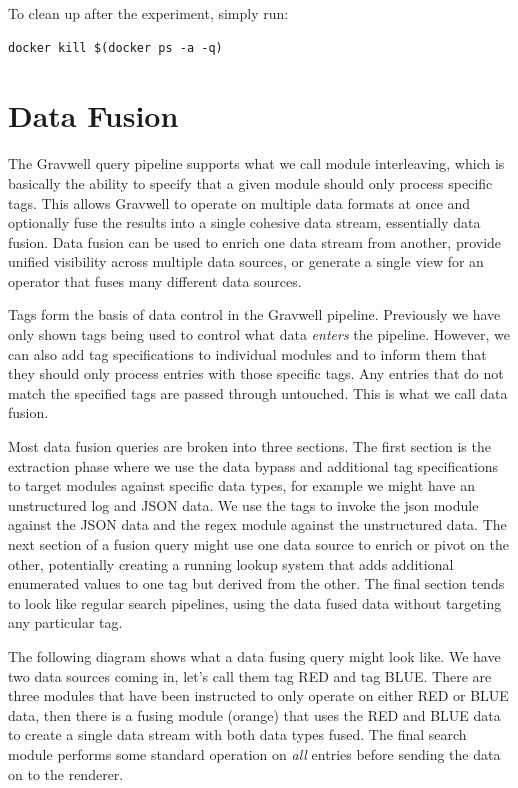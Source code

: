 To clean up after the experiment, simply run:

\begin{Verbatim}[breaklines=true]
docker kill $(docker ps -a -q)
\end{Verbatim}


\clearpage

\section{Data Fusion}
The Gravwell query pipeline supports what we call module interleaving,
which is basically the ability to specify that a given module should only process
specific tags. This allows Gravwell to operate on multiple data formats
at once and optionally fuse the results into a single cohesive data
stream, essentially data fusion. Data fusion can be used to enrich one
data stream from another, provide unified visibility across multiple
data sources, or generate a single view for an operator that fuses many
different data sources.

Tags form the basis of data control in the Gravwell pipeline.
Previously we have only shown tags being used
to control what data \emph{enters} the pipeline. However, we can also add tag
specifications to individual modules and to inform them that they should
only process entries with those specific tags. Any entries that do not
match the specified tags are passed through untouched. This is what we
call data fusion.

Most data fusion queries are broken into three sections. The first section
is the extraction phase where we use the data bypass and additional
tag specifications to target modules against specific data types,
for example we might have an unstructured log and JSON data. We use
the tags to invoke the json module against the JSON data and the regex
module against the unstructured data. The next section of a fusion query
might use one data source to enrich or pivot on the other, potentially
creating a running lookup system that adds additional enumerated values
to one tag but derived from the other. The final section tends to look like
regular search pipelines, using the data fused data without targeting any particular tag.

The following diagram shows what a data fusing query might look like.
We have two data sources coming in, let's call them tag RED and tag
BLUE. There are three modules that have been instructed to only
operate on either RED or BLUE data, then there is a fusing
module (orange) that uses the RED and BLUE data to create a
single data stream with both data types fused. The final search module
performs some standard operation on \emph{all} entries before sending the data on to the
renderer.


